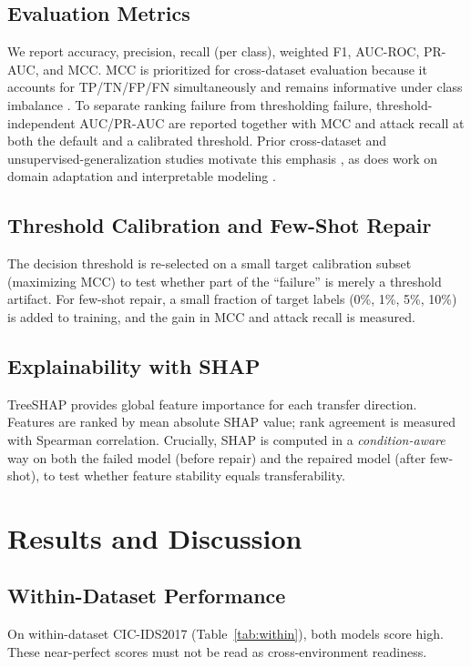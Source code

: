 \documentclass[11pt,a4paper]{article}
\begin{document}
\subsection{Evaluation Metrics}
We report accuracy, precision, recall (per class), weighted F1, AUC-ROC, PR-AUC, and MCC.
MCC is prioritized for cross-dataset evaluation because it accounts for TP/TN/FP/FN
simultaneously and remains informative under class imbalance \cite{chicco}. To separate
ranking failure from thresholding failure, threshold-independent AUC/PR-AUC are reported
together with MCC and attack recall at both the default and a calibrated threshold. Prior cross-dataset
and unsupervised-generalization studies motivate this emphasis \cite{verkerken}, as does
work on domain adaptation \cite{sun} and interpretable modeling \cite{molnar}.

\subsection{Threshold Calibration and Few-Shot Repair}
The decision threshold is re-selected on a small target calibration subset (maximizing MCC)
to test whether part of the ``failure'' is merely a threshold artifact. For few-shot repair,
a small fraction of target labels (0\%, 1\%, 5\%, 10\%) is added to training, and the gain
in MCC and attack recall is measured.

\subsection{Explainability with SHAP}
TreeSHAP provides global feature importance for each transfer direction. Features are ranked
by mean absolute SHAP value; rank agreement is measured with Spearman correlation.
Crucially, SHAP is computed in a \emph{condition-aware} way on both the failed model (before
repair) and the repaired model (after few-shot), to test whether feature stability equals
transferability.

\section{Results and Discussion}
\subsection{Within-Dataset Performance}
On within-dataset CIC-IDS2017 (Table~\ref{tab:within}), both models score high. These
near-perfect scores must not be read as cross-environment readiness.
\end{document}
